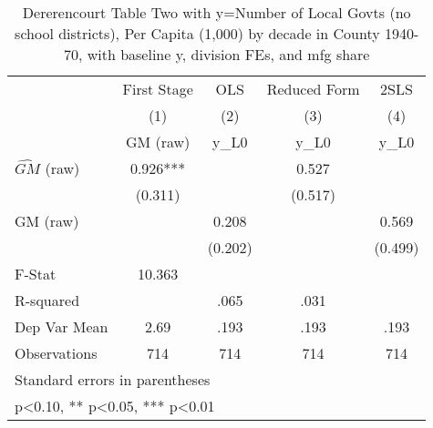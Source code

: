 \begin{table}[htbp]\centering
\def\sym#1{\ifmmode^{#1}\else\(^{#1}\)\fi}
\caption{Dererencourt Table Two with y=Number of Local Govts (no school districts), Per Capita (1,000) by decade in County 1940-70, with baseline y, division FEs, and mfg share}
\begin{tabular}{l*{4}{c}}
\toprule
                    & First Stage   &         OLS   &Reduced Form   &        2SLS   \\
                    &\multicolumn{1}{c}{(1)}&\multicolumn{1}{c}{(2)}&\multicolumn{1}{c}{(3)}&\multicolumn{1}{c}{(4)}\\
                    &\multicolumn{1}{c}{GM  (raw)}&\multicolumn{1}{c}{y\_L0}&\multicolumn{1}{c}{y\_L0}&\multicolumn{1}{c}{y\_L0}\\
\midrule
$\hat{GM}$ (raw)    &       0.926***&               &       0.527   &               \\
                    &     (0.311)   &               &     (0.517)   &               \\
\addlinespace
GM  (raw)           &               &       0.208   &               &       0.569   \\
                    &               &     (0.202)   &               &     (0.499)   \\
\midrule
F-Stat              &      10.363   &               &               &               \\
R-squared           &               &        .065   &        .031   &               \\
Dep Var Mean        &        2.69   &        .193   &        .193   &        .193   \\
Observations        &         714   &         714   &         714   &         714   \\
\bottomrule
\multicolumn{5}{l}{\footnotesize Standard errors in parentheses}\\
\multicolumn{5}{l}{\footnotesize * p<0.10, ** p<0.05, *** p<0.01}\\
\end{tabular}
\end{table}
